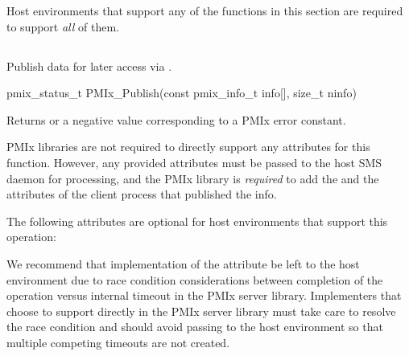 \advicermstart
Host environments that support any of the functions in this section are required to support \textit{all} of them.
\advicermend

\subsection{}

\summary

Publish data for later access via .

\format

\cspecificstart
\begin{codepar}
pmix_status_t
PMIx_Publish(const pmix_info_t info[], size_t ninfo)
\end{codepar}
\cspecificend

\begin{arglist}
\end{arglist}

Returns  or a negative value corresponding to a PMIx error constant.

\reqattrstart
\ac{PMIx} libraries are not required to directly support any attributes for this function. However, any provided attributes must be passed to the host \ac{SMS} daemon for processing, and the \ac{PMIx} library is \textit{required} to add the  and the  attributes of the client process that published the info.

\reqattrend

\optattrstart
The following attributes are optional for host environments that support this operation:


\optattrend

\adviceimplstart
We recommend that implementation of the  attribute be left to the host environment due to race condition considerations between completion of the operation versus internal timeout in the \ac{PMIx} server library. Implementers that choose to support  directly in the \ac{PMIx} server library must take care to resolve the race condition and should avoid passing  to the host environment so that multiple competing timeouts are not created.
\adviceimplend

